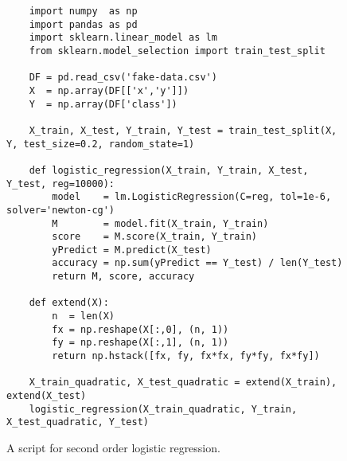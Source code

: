 \begin{figure}[!ht]
\centering

\begin{verbatim}
    import numpy  as np
    import pandas as pd
    import sklearn.linear_model as lm
    from sklearn.model_selection import train_test_split
    
    DF = pd.read_csv('fake-data.csv')
    X  = np.array(DF[['x','y']])
    Y  = np.array(DF['class'])
    
    X_train, X_test, Y_train, Y_test = train_test_split(X, Y, test_size=0.2, random_state=1)
    
    def logistic_regression(X_train, Y_train, X_test, Y_test, reg=10000):
        model    = lm.LogisticRegression(C=reg, tol=1e-6, solver='newton-cg')
        M        = model.fit(X_train, Y_train)
        score    = M.score(X_train, Y_train)
        yPredict = M.predict(X_test)
        accuracy = np.sum(yPredict == Y_test) / len(Y_test)
        return M, score, accuracy
    
    def extend(X):
        n  = len(X)
        fx = np.reshape(X[:,0], (n, 1))
        fy = np.reshape(X[:,1], (n, 1))
        return np.hstack([fx, fy, fx*fx, fy*fy, fx*fy])
    
    X_train_quadratic, X_test_quadratic = extend(X_train), extend(X_test)
    logistic_regression(X_train_quadratic, Y_train, X_test_quadratic, Y_test)
\end{verbatim}

\caption{A script for second order logistic regression.}
\label{fig:Polynomial-Logistic-Regression.ipynb-quadratic}
\end{figure}

